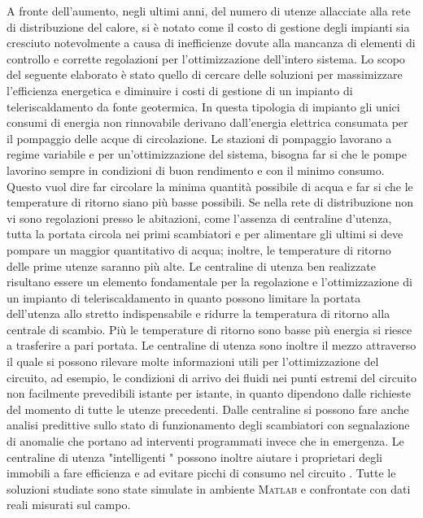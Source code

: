 \documentclass[laurea,oneside,11pt]{USiena_tesiLM}
\begin{document}
A fronte dell'aumento, negli ultimi anni, del numero di utenze allacciate alla rete di distribuzione del calore, si è notato come il costo di gestione degli impianti sia cresciuto notevolmente a causa di inefficienze dovute alla mancanza di elementi di controllo e corrette regolazioni per l'ottimizzazione dell'intero sistema.
Lo scopo del seguente elaborato è stato quello di cercare delle soluzioni per massimizzare l'efficienza energetica e diminuire i costi di gestione di un impianto di teleriscaldamento da fonte geotermica. In questa tipologia di impianto gli unici consumi di energia non rinnovabile  derivano dall'energia elettrica consumata  per il pompaggio delle acque di circolazione. 
Le stazioni di pompaggio lavorano a regime variabile e per un'ottimizzazione del sistema, bisogna far si che le pompe lavorino sempre in condizioni di buon rendimento e con il minimo consumo. Questo vuol dire far circolare la minima quantità possibile di acqua e far si che le temperature di ritorno siano più basse possibili. Se nella rete di distribuzione non vi sono regolazioni presso le abitazioni, come l'assenza di centraline d'utenza, tutta la portata circola nei primi scambiatori e per alimentare gli ultimi si deve pompare un maggior quantitativo di acqua; inoltre, le temperature di ritorno delle prime utenze saranno più alte. Le centraline di utenza ben realizzate risultano essere un elemento fondamentale per la regolazione e l'ottimizzazione di un impianto di teleriscaldamento in quanto possono  limitare la portata dell'utenza allo stretto indispensabile e ridurre la temperatura di ritorno alla centrale di scambio. Più le temperature di ritorno sono basse più energia si riesce a trasferire a pari portata. Le centraline di utenza sono inoltre il mezzo attraverso il quale si possono rilevare molte informazioni utili per l'ottimizzazione del circuito, ad esempio, le condizioni di arrivo dei fluidi nei punti estremi del circuito non facilmente prevedibili istante per istante, in quanto dipendono dalle richieste del momento di tutte le utenze precedenti.
Dalle centraline si possono fare anche analisi predittive sullo stato di funzionamento degli scambiatori con segnalazione di anomalie che portano ad interventi programmati invece che in emergenza.
Le centraline di utenza "intelligenti " possono inoltre aiutare i proprietari degli immobili a fare efficienza e ad evitare picchi di consumo nel circuito .
Tutte le soluzioni studiate sono state simulate in ambiente \textsc{Matlab} e confrontate con dati reali misurati sul campo.\\
\end{document}
